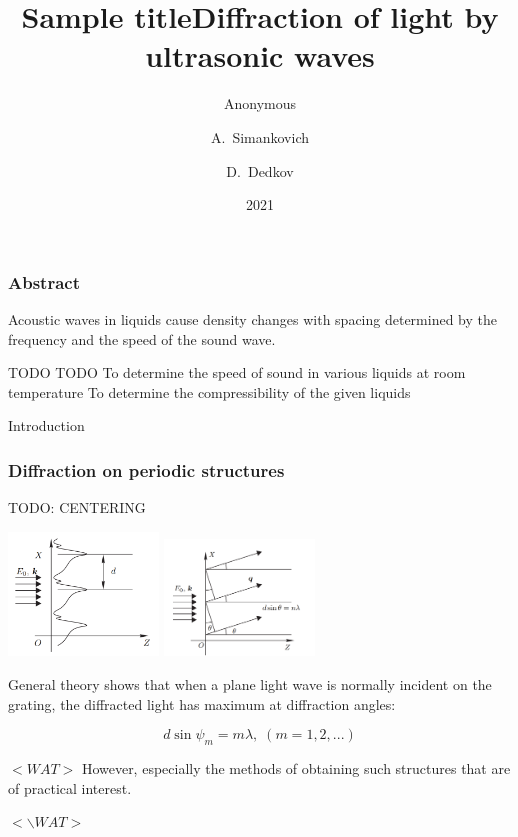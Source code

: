 \documentclass{beamer}
\title{Sample title}
\author{Anonymous}
\institute{Overleaf}
\date{2021}
\title[About Beamer] %
{Diffraction of light by ultrasonic waves}
\author[Arthur, Doe] %
{A.~Simankovich \and D.~Dedkov }
\institute[VFU] %
{
	Moscow Institute of Physics and Technology
}
\date[VLC 2023] %
\begin{document}
	
	\frame{\titlepage}
	
	\begin{frame}
		\frametitle{Abstract}
		Acoustic waves in liquids cause density changes with spacing determined by the
		frequency and the speed of the sound wave.
		
			
		TODO TODO
		To determine the speed of sound in various liquids at room temperature
		To determine the compressibility of the given liquids

	\end{frame}
	
		\begin{frame}[plain,c]
		
		\begin{center}
			\huge {} Introduction
		\end{center}
		
	\end{frame}
		
	
	\begin{frame}
		\frametitle{Diffraction on periodic structures}
		
		TODO: CENTERING
		
		\includegraphics[width=4cm]{res/periodic.png}
		\includegraphics[width=4cm]{res/diffraction_general.png}
		
		
		General theory shows that when a plane light wave is normally incident on the grating, the diffracted light has maximum at diffraction angles:

		$$d \sin{\psi_m} = m \lambda,\; (m = 1, 2, ...)$$
		
		$<WAT>$
		However, especially the methods of obtaining such structures that are of practical interest.

		$<\backslash WAT>$
	\end{frame}
\end{document}
